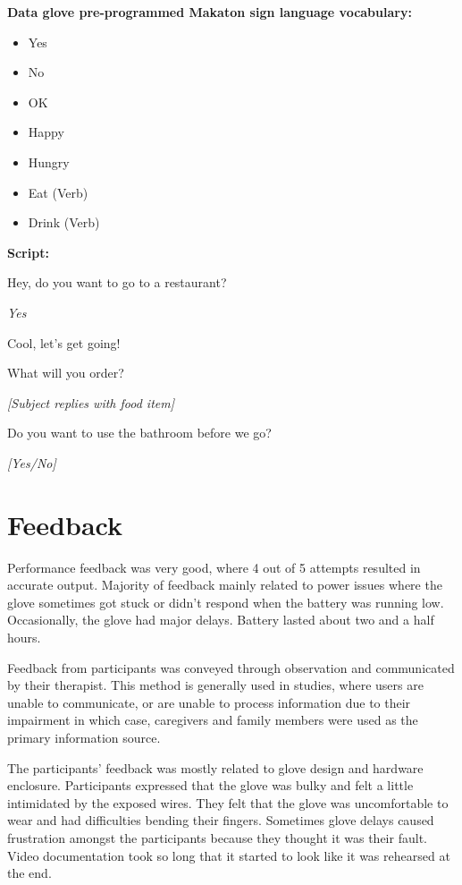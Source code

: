 \textbf{Data glove pre-programmed Makaton sign language vocabulary:}

\begin{itemize}
  \item Yes
  \item No
  \item OK
  \item Happy
  \item Hungry
  \item Eat (Verb)
  \item Drink (Verb)
\end{itemize}

\textbf{Script:}

\begin{description}
  \item Hey, do you want to go to a restaurant?
  \item \textit{Yes}
  \item Cool, let's get going!
  \item What will you order?
  \item \textit{[Subject replies with food item]}
  \item Do you want to use the bathroom before we go?
  \item \textit{[Yes/No]}
\end{description}

\section{Feedback} 

Performance feedback was very good, where 4 out of 5 attempts resulted in accurate output. Majority of feedback mainly related to power issues where the glove sometimes got stuck or didn't respond when the battery was running low. Occasionally, the glove had major delays. Battery lasted about two and a half hours. 

Feedback from participants was conveyed through observation and communicated by their therapist. This method is generally used in studies, where users are unable to communicate, or are unable to process information due to their impairment \parencite{Lazar2010} in which case, caregivers and family members were used as the primary information source. 

The participants' feedback was mostly related to glove design and hardware enclosure. Participants expressed that the glove was bulky and felt a little intimidated by the exposed wires. They felt that the glove was uncomfortable to wear and had difficulties bending their fingers. Sometimes glove delays caused frustration amongst the participants because they thought it was their fault. Video documentation took so long that it started to look like it was rehearsed at the end. 

